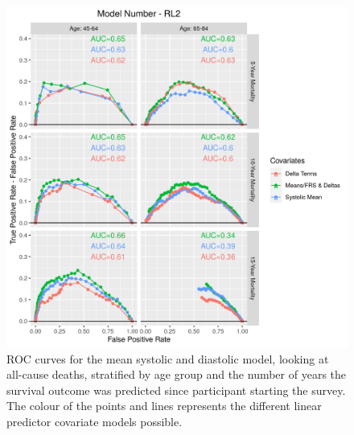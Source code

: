 \documentclass[
]{article}
\begin{document}
\begin{figure}
\hypertarget{fig:ROC_RL2}{%
\centering
\includegraphics{./Rmarkdown_Plots/ROC_CAx-Covariates_EventType_RL2.png}
\caption{ROC curves for the mean systolic and diastolic model, looking at all-cause deaths, stratified by age group and the number of years the survival outcome was predicted since participant starting the survey. The colour of the points and lines represents the different linear predictor covariate models possible.}\label{fig:ROC_RL2}
}
\end{figure}
\end{document}
